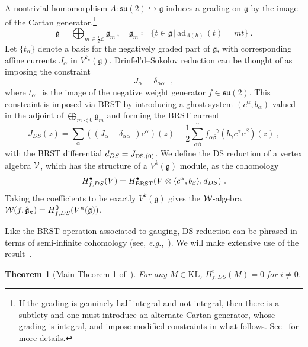 \documentclass[a4paper]{article}
\newtheorem{thm}{Theorem}[section]
\def\IZ{\mathbb{Z}}
\def\VV{{\cal V}}
\def\WW{{\cal W}}
\def\suf{\mathfrak{su}}
\def\gf{\mathfrak{g}}
\def \eg{{\it e.g.}}
\def \KL{\mathrm{KL}}
\begin{document}
A nontrivial homomorphism $\Lambda:\suf(2)\hookrightarrow \gf$ induces a grading on $\gf$ by the image of the Cartan generator,\footnote{If the grading is genuinely half-integral and not integral, then there is a subtlety and one must introduce an alternate Cartan generator, whose grading is integral, and impose modified constraints in what follows. See~\cite{Feher:1992ed,deBoer:1992sy,deBoer:1993iz} for more details.}
\begin{equation}
    \gf = \bigoplus_{m\in\frac{1}{2}\IZ}\gf_m \,,\quad \gf_m \coloneqq \{t\in\gf\,|\, \mathrm{ad}_{\Lambda(h)}\,(t) = mt\}~.
\end{equation}
Let $\{t_\alpha\}$ denote a basis for the negatively graded part of $\gf$, with corresponding affine currents $J_\alpha$ in $V^{k_c}(\gf)$. Drinfel'd--Sokolov reduction can be thought of as imposing the constraint
\begin{equation}
    J_\alpha = \delta_{\alpha\alpha_-}~,
\end{equation}
where $t_{\alpha_-}$ is the image of the negative weight generator $f\in\suf(2)$. This constraint is imposed via BRST by introducing a ghost system $(c^\alpha,b_\alpha)$ valued in the adjoint of $\bigoplus_{m<0}\gf_{m}$ and forming the BRST current
\begin{equation}
   J_{DS}(z) = \sum_\alpha\left((J_\alpha - \delta_{\alpha\alpha_-})c^\alpha\right)(z) - \frac{1}{2}\sum_{\alpha\beta}^{\gamma} f_{\alpha\beta}^{\phantom{\alpha\beta}\gamma}(b_\gamma c^\alpha c^\beta)(z)~,
\end{equation}
with the BRST differential $d_{DS} = J_{{\rm DS},(0)}$. We define the DS reduction of a vertex algebra $\VV$, which has the structure of a $V^{k}(\gf)$ module, as the cohomology
\begin{equation}
	H^\bullet_{f,DS}(V) = H_{\rm BRST}^\bullet(V\otimes\langle c^\alpha,b_\beta\rangle,d_{DS})~.
\end{equation}
Taking the coefficients to be exactly $V^{k}(\gf)$ gives the $\WW$-algebra $\WW(f,\hat{\gf}_{\kappa})=H^0_{f,DS}(V^{\kappa}(\gf))$.

Like the BRST operation associated to gauging, DS reduction can be phrased in terms of semi-infinite cohomology (see, \eg,~\cite{Arakawa2017introduction}). We will make extensive use of the result~\cite{Arakawa:2007rep}.

\smallskip

\begin{thm}[\textup{Main Theorem 1 of~\cite{Arakawa:2007rep}}]\label{thm:ds_vanish}
     For any $M\in\KL$, $H^{i}_{f,DS}(M)=0$ for $i\neq0$.
\end{thm}
\end{document}
